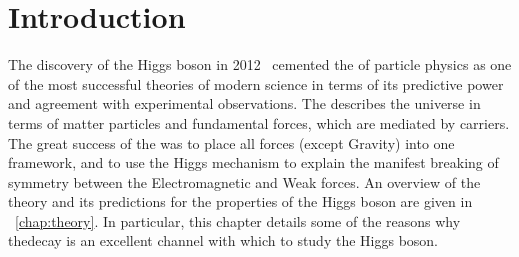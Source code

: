 \chapter{Introduction}
\label{chap:intro}

The discovery of the Higgs boson in 2012~\cite{CMSHDisc,ATLASHDisc} cemented the \SM of particle physics as one of the most successful theories of modern science in terms of its predictive power and agreement with experimental observations. The \SM describes the universe in terms of matter particles and fundamental forces, which are mediated by carriers. The great success of the \SM was to place all forces (except Gravity) into one framework, and to use the Higgs mechanism to explain the manifest breaking of symmetry between the Electromagnetic and Weak forces. An overview of the theory and its predictions for the properties of the Higgs boson are given in \Chap~\ref{chap:theory}. In particular, this chapter details some of the reasons why the\Hgg decay is an excellent channel with which to study the Higgs boson. %

